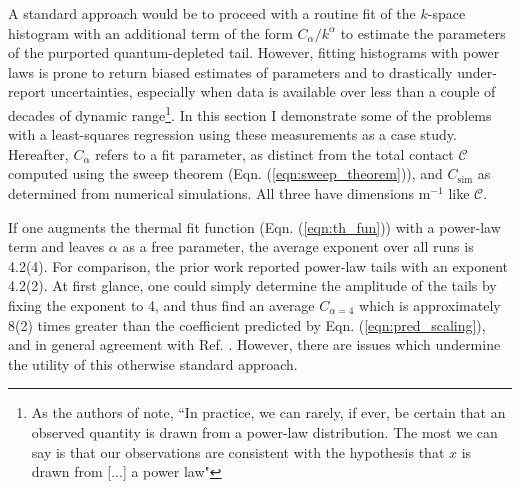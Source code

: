 	A standard approach would be to proceed with a routine fit of the $k$-space histogram with an additional term of the form $C_\alpha/k^\alpha$ to estimate the parameters of the purported quantum-depleted tail.
	However, fitting histograms with power laws is prone to return biased estimates of parameters and to drastically under-report uncertainties,\cite{Clauset09,Virkar14} especially when data is available over less than a couple of decades of dynamic range\footnote{As the authors of \cite{Clauset09} note, ``In practice, we can rarely, if ever, be certain that an observed quantity is drawn from a power-law distribution. The most we can say is that our observations are consistent with the hypothesis that $x$ is drawn from [...] a power law"}.
	In this section I demonstrate some of the problems with a least-squares regression using these measurements as a case study.
	Hereafter, $C_\alpha$ refers to a fit parameter, as distinct from the total contact $\mathcal{C}$ computed using the sweep theorem (Eqn. (\ref{eqn:sweep_theorem})), and $C_\textrm{sim}$ as determined from  numerical simulations. {All three have dimensions m${}^{-1}$ like $\mathcal{C}$.}
	
	If one augments the {thermal} fit function (Eqn. (\ref{eqn:th_fun})) with a power-law term and leaves $\alpha$ as a free parameter, the average exponent over all runs is 4.2(4). 
	For comparison, the prior work \cite{Chang16} reported power-law tails with an exponent 4.2(2).
	At first glance, one could simply determine the amplitude of the tails by fixing the exponent to 4, and thus find an average $C_{\alpha=4}$ which is approximately 8(2) times greater than the coefficient predicted by Eqn. (\ref{eqn:pred_scaling}), and in general agreement with Ref. \cite{Chang16}.
	However, there are issues which undermine the utility of this otherwise standard approach.


